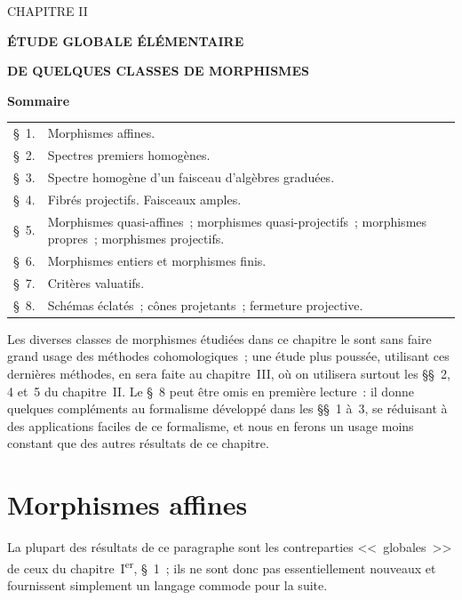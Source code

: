\label{chapter:II-fr}

\begin{center}
{\large CHAPITRE II\par}
\vspace{1.5em}
{\Large\bfseries ÉTUDE GLOBALE ÉLÉMENTAIRE\par}
{\Large\bfseries DE QUELQUES CLASSES DE MORPHISMES\par}
\vspace{1.8em}
{\bfseries Sommaire\par}
\end{center}

\medskip
\begin{tabular}{@{}r@{\ }p{}@{}}
\S~1. & Morphismes affines.\\
\S~2. & Spectres premiers homogènes.\\
\S~3. & Spectre homogène d'un faisceau d'algèbres graduées.\\
\S~4. & Fibrés projectifs. Faisceaux amples.\\
\S~5. & Morphismes quasi-affines~; morphismes quasi-projectifs~; morphismes
         propres~; morphismes projectifs.\\
\S~6. & Morphismes entiers et morphismes finis.\\
\S~7. & Critères valuatifs.\\
\S~8. & Schémas éclatés~; cônes projetants~; fermeture projective.
\end{tabular}

\medskip
Les diverses classes de morphismes étudiées dans ce chapitre le sont sans
faire grand usage des méthodes cohomologiques~; une étude plus poussée,
utilisant ces dernières méthodes, en sera faite au chapitre~III, où on
utilisera surtout les \S\S~2, 4 et~5 du chapitre~II. Le \S~8 peut être omis en
première lecture~: il donne quelques compléments au formalisme développé dans
les \S\S~1 à~3, se réduisant à des applications faciles de ce formalisme, et
nous en ferons un usage moins constant que des autres résultats de ce
chapitre.

\setcounter{section}{0}
\section{Morphismes affines}
\label{section:II.1-fr}

La plupart des résultats de ce paragraphe sont les contreparties
<<~globales~>> de ceux du chapitre~I\textsuperscript{er}, \S~1~; ils ne sont
donc pas essentiellement nouveaux et fournissent simplement un langage
commode pour la suite.


